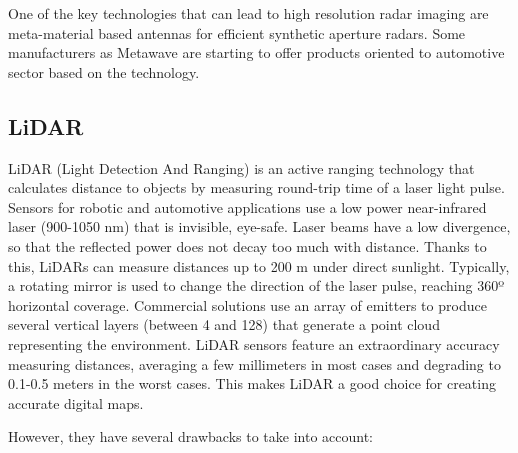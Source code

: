 One of the key technologies that can lead to high resolution radar imaging are 
meta-material based antennas \cite{Brookner2016,Sleasman2017} for efficient
synthetic aperture radars. 
Some manufacturers as Metawave \cite{Metawave2018} are starting 
to offer products oriented to automotive sector based on the technology.



\subsection{LiDAR}
\label{sec:02-c-lidar}
LiDAR (Light Detection And Ranging) is an active ranging technology that 
calculates distance to objects by measuring round-trip time of a laser light 
pulse.
Sensors for robotic and automotive applications use a low power 
near-infrared laser (900-1050 nm) that is invisible, eye-safe. 
Laser beams have a low divergence, so that the reflected power does not decay 
too much with distance. Thanks to this, LiDARs can measure distances up to 
200 m under direct sunlight.
Typically, a rotating mirror is used to change the direction of the laser 
pulse, reaching 360º horizontal coverage. Commercial solutions use an array of 
emitters to produce several vertical layers (between 4 and 128) 
that generate a point cloud representing the environment.
LiDAR sensors feature an extraordinary accuracy measuring distances, averaging
a few millimeters in most cases and degrading to 0.1-0.5 meters in the worst 
cases. This makes LiDAR a good choice for creating accurate digital maps.

However, they have several drawbacks to take into account:

